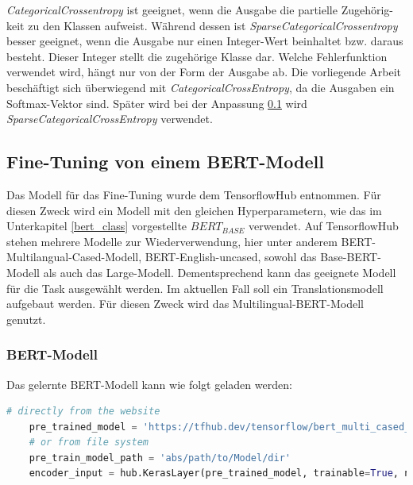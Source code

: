 \textit{CategoricalCrossentropy} ist geeignet, wenn die Ausgabe die partielle Zugehörig-keit zu den Klassen aufweist. Während dessen ist \textit{SparseCategoricalCrossentropy} besser geeignet, wenn die Ausgabe nur einen Integer-Wert beinhaltet bzw. daraus besteht. Dieser Integer stellt die zugehörige Klasse dar. Welche Fehlerfunktion verwendet wird, hängt nur von der Form der Ausgabe ab. Die vorliegende Arbeit beschäftigt sich überwiegend mit \textit{CategoricalCrossEntropy}, da die Ausgaben ein Softmax-Vektor sind. Später wird bei der Anpassung \ref{fine_tuning} wird \textit{SparseCategoricalCrossEntropy} verwendet.

\subsection{Fine-Tuning von einem BERT-Modell}\label{fine_tuning}

Das Modell für das Fine-Tuning wurde dem TensorflowHub \cite{tfhub:21} entnommen. Für diesen Zweck wird ein Modell mit den gleichen Hyperparametern, wie das im Unterkapitel \ref{bert_class} vorgestellte $BERT_{BASE}$ verwendet. Auf TensorflowHub stehen mehrere Modelle zur Wiederverwendung, hier unter anderem BERT-Multilangual-Cased-Modell, BERT-English-uncased, sowohl das Base-BERT-Modell als auch das Large-Modell. Dementsprechend kann das geeignete Modell für die Task ausgewählt werden. Im aktuellen Fall soll ein Translationsmodell aufgebaut werden. Für diesen Zweck wird das Multilingual-BERT-Modell \cite{BERTMM:21} genutzt. 

\subsubsection{BERT-Modell}

Das gelernte BERT-Modell kann wie folgt geladen werden:

\begin{lstlisting}[language=Python, caption={Laden von dem BERT-Modell}]
	# directly from the website
	pre_trained_model = 'https://tfhub.dev/tensorflow/bert_multi_cased_L-12_H-768_A-12/4'
	# or from file system
	pre_train_model_path = 'abs/path/to/Model/dir'
	encoder_input = hub.KerasLayer(pre_trained_model, trainable=True, name="BERT_Encoder")
\end{lstlisting}

